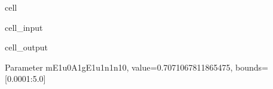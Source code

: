 \documentclass[letterpaper,table,10pt,english]{jupyterBook}
\begin{document}
\begin{sphinxuseclass}{cell}\begin{sphinxVerbatimInput}

\begin{sphinxuseclass}{cell_input}
\begin{sphinxVerbatim}[commandchars=\\\{\}]

\PYG{p}{[}\PYG{p}{]}
\end{sphinxVerbatim}

\end{sphinxuseclass}\end{sphinxVerbatimInput}
\begin{sphinxVerbatimOutput}

\begin{sphinxuseclass}{cell_output}
\begin{sphinxVerbatim}[commandchars=\\\{\}]
\PYGZlt{}Parameter \PYGZsq{}m\PYGZus{}E1u\PYGZus{}0\PYGZus{}A1g\PYGZus{}E1u\PYGZus{}1\PYGZus{}n1\PYGZus{}n1\PYGZus{}0\PYGZsq{}, value=0.7071067811865475, bounds=[0.0001:5.0]\PYGZgt{}
\end{sphinxVerbatim}

\end{sphinxuseclass}\end{sphinxVerbatimOutput}

\end{sphinxuseclass}
\end{document}

